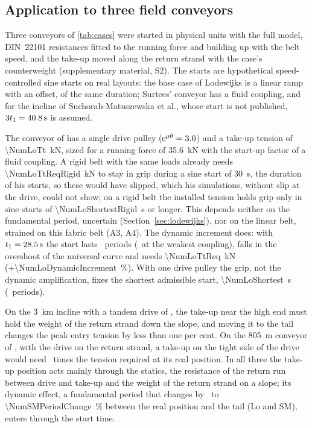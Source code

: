 \subsection{Application to three field conveyors}\label{sec:application}

Three conveyors of \cref{tab:cases} were started in physical units with the full model, DIN~22101
resistances fitted to the running force and building up with the belt speed, and the take-up
moved along the return strand with the case's counterweight (supplementary material, S2). The
starts are hypothetical speed-controlled sine starts on real layouts: the base case of Lodewijks is a linear ramp with an offset, of the same duration; Surtees' conveyor has a fluid
coupling, and for the incline of Suchorab-Matuszewska et al., whose start is not published,
$3t_{1}=\qty{40.8}{\second}$ is assumed.

The conveyor of \citet{lodewijks1996} has a single drive pulley ($\mathrm{e}^{\mu\theta}=3.0$)
and a take-up tension of \qty{\NumLoTt}{\kilo\newton}, sized for a running force of
\qty{35.6}{\kilo\newton} \citep[Eq.~8.6]{lodewijks1996} with the start-up factor of a fluid
coupling. A rigid belt with the same loads already needs
\qty{\NumLoTtReqRigid}{\kilo\newton} to stay in grip during a sine start of \qty{30}{\second},
the duration of his starts, so these would have slipped, which his simulations, without slip at
the drive, could not show; on a rigid belt the installed tension holds grip only in sine starts of
\qty{\NumLoShortestRigid}{\second} or longer. This depends neither on the fundamental period, uncertain
(Section~\ref{sec:lodewijks}), nor on the linear belt, strained on this fabric belt (A3, A4). The
dynamic increment does: with $t_{1}=\qty{28.5}{\second}$
the start lasts \NumPracticeLo\ periods (\NumLoPracticeLow\ at the weakest coupling), falls in the
overshoot of the universal curve and needs \qty{\NumLoTtReq}{\kilo\newton}
(+\qty{\NumLoDynamicIncrement}{\percent}). With one drive pulley the grip, not the dynamic
amplification, fixes the shortest admissible start, \qty{\NumLoShortest}{\second}
(\NumLoShortestOverPeriod\ periods).

On the \qty{3}{\kilo\metre} incline with a tandem drive of \citet{suchorab2025longdistance}, the take-up near the high end
must hold the weight of the return strand down the slope, and moving it to the tail changes the
peak entry tension by less than one per cent. On the \qty{805}{\metre} conveyor of
\citet{surtees1995runback}, with the drive on the return strand, a take-up on the tight side of
the drive would need \NumSuTightFactor\ times the tension required at its real position. In all
three the take-up position acts mainly through the statics, the resistance of the return run
between drive and take-up and the weight of the return strand on a slope; its dynamic effect, a fundamental period that changes by \NumLoPeriodChange\ to
\qty{\NumSMPeriodChange}{\percent} between the real position and the tail (Lo and SM), enters through the
start time.
